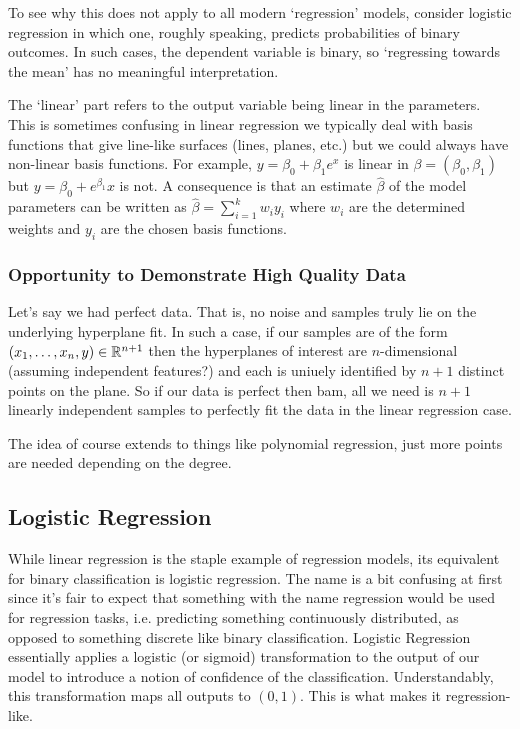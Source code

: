 \documentclass[11pt]{article}
\begin{document}
To see why this does not apply to all modern `regression' models, consider logistic regression in which one, roughly speaking, predicts probabilities of binary outcomes. In such cases, the dependent variable is binary, so `regressing towards the mean' has no meaningful interpretation.

The `linear' part refers to the output variable being linear in the parameters. This is sometimes confusing in linear regression we typically deal with basis functions that give line-like surfaces (lines, planes, etc.) but we could always have non-linear basis functions. For example, $y=\beta_0+\beta_1 e^x$ is linear in $\beta=(\beta_0,\beta_1)$ but $y=\beta_0+e^{\beta_1}x$ is not. A consequence is that an estimate $\hat{\beta}$ of the model parameters can be written as $\hat{\beta}=\sum_{i=1}^k w_iy_i$ where $w_i$ are the determined weights and $y_i$ are the chosen basis functions.

\subsubsection{Opportunity to Demonstrate High Quality Data}

Let's say we had perfect data. That is, no noise and samples truly lie on the underlying hyperplane fit. In such a case, if our samples are of the form $(x_1,\dots,x_n,y)\in\mathbb{R}^{n+1}$ then the hyperplanes of interest are $n$-dimensional (assuming independent features?) and each is uniuely identified by $n+1$ distinct points on the plane. So if our data is perfect then bam, all we need is $n+1$ linearly independent samples to perfectly fit the data in the linear regression case.

The idea of course extends to things like polynomial regression, just more points are needed depending on the degree.

\subsection{Logistic Regression}

While linear regression is the staple example of regression models, its equivalent for binary classification is logistic regression. The name is a bit confusing at first since it's fair to expect that something with the name regression would be used for regression tasks, i.e. predicting something continuously distributed, as opposed to something discrete like binary classification. Logistic Regression essentially applies a logistic (or sigmoid) transformation to the output of our model to introduce a notion of confidence of the classification. Understandably, this transformation maps all outputs to $(0,1)$. This is what makes it regression-like.
\end{document}

